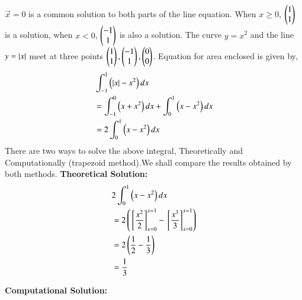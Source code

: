 \documentclass[journal]{IEEEtran}
\begin{document}
$\vec{x}=0$ is a common solution to both parts of the line equation. When $x\ge0$, $\begin{pmatrix}1\\1\end{pmatrix}$ is a solution, when $x<0$, $\begin{pmatrix}-1\\1\end{pmatrix}$ is also a solution.\newline
The curve $y=x^2$ and the line $y=\left\vert x\right\vert$ meet at three points $\begin{pmatrix}1\\1\end{pmatrix}, \begin{pmatrix}-1\\1\end{pmatrix}, \begin{pmatrix}0\\0\end{pmatrix}$.\newline
Equation for area enclosed is given by,
\begin{align}
  &\int_{-1}^1\left(\left\vert x\right\vert-x^2\right)dx\\
  &=\int_{-1}^{0}\left(x+x^2\right)dx + \int_0^1\left(x-x^2\right)dx\\
  &=2\int_0^1\left(x-x^2\right)dx
\end{align}
There are two ways to solve the above integral, Theoretically and Computationally (trapezoid method).We shall compare the results obtained by both methods.\newline
\textbf{Theoretical Solution:}\newline
\begin{align}
  &2\int_0^1 \left(x-x^2\right)dx\\
  &=2\left({}\left[\frac{x^2}{2}\right]_{x=0}^{x=1} -{}\left[\frac{x^3}{3}\right]_{x=0}^{x=1}\right)\\
  &=2\left(\frac{1}{2}-\frac{1}{3}\right)\\
  &=\frac{1}{3}
\end{align}

\textbf{Computational Solution:}\newline
\end{document}
